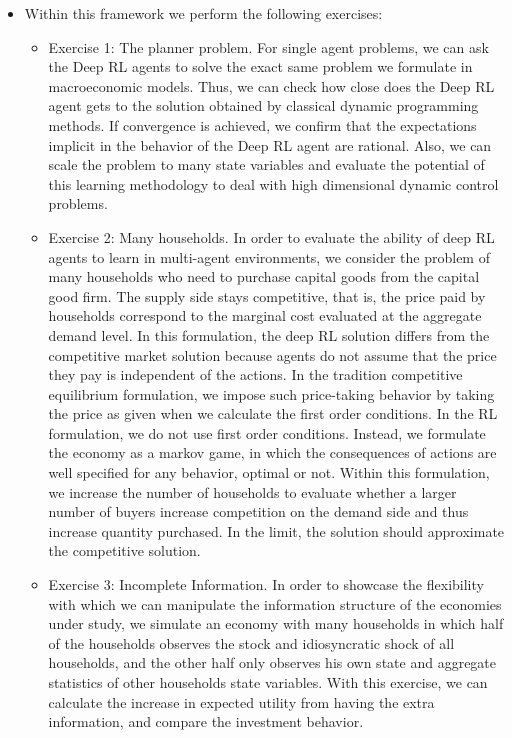 \documentclass[11pt,english]{article}
\begin{document}
\begin{itemize}
	\item Within this framework we perform the following exercises:
	
	\begin{itemize} 
		\item Exercise 1: The planner problem. For single agent problems, we can ask the Deep RL agents to solve the exact same problem we formulate in macroeconomic models. Thus, we can check how close does the Deep RL agent gets to the solution obtained by classical dynamic programming methods. If convergence is achieved, we confirm that the expectations implicit in the behavior of the Deep RL agent  are rational. Also, we can scale the problem to many state variables and evaluate the potential of this learning methodology to deal with high dimensional dynamic control problems. \medskip
		
		\item Exercise 2: Many households. In order to evaluate the ability of deep RL agents to learn in multi-agent environments, we consider the problem of many households who need to purchase capital goods from the capital good firm. The supply side stays competitive, that is, the price paid by households correspond to the marginal cost evaluated at the aggregate demand level. In this formulation, the deep RL solution differs from the competitive market solution because agents do not assume that the price they pay is independent of the actions. In the tradition competitive equilibrium formulation, we impose such price-taking behavior by taking the price as given when we calculate the first order conditions. In the RL formulation, we do not use first order conditions. Instead, we formulate the economy as a markov game, in which the consequences of actions are well specified for any behavior, optimal or not. Within this formulation, we increase the number of households to evaluate whether a larger number of buyers increase competition on the demand side and thus increase quantity purchased. In the limit, the solution should approximate the competitive solution.   \medskip
		
		\item Exercise 3: Incomplete Information. In order to showcase the flexibility with which we can manipulate the information structure of the economies under study, we simulate an economy with many households in which half of the households observes the stock and idiosyncratic shock of all households, and the other half only observes his own state and aggregate statistics of other households state variables. With this exercise, we can calculate the increase in expected utility from having the extra information, and compare the investment behavior. \medskip
		

\end{itemize}
\end{itemize}
\end{document}
